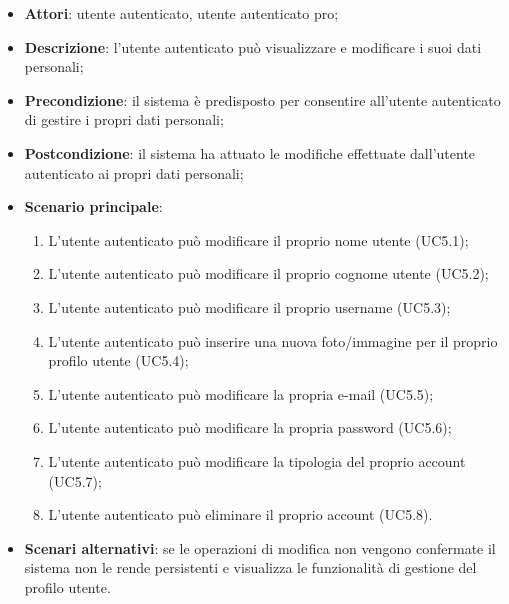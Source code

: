 \begin{itemize}
	\item \textbf{Attori}: utente autenticato, utente autenticato pro;
	\item \textbf{Descrizione}: l'utente autenticato può visualizzare e modificare i suoi dati personali;
	\item \textbf{Precondizione}: il sistema è predisposto per consentire all'utente autenticato di gestire i propri dati personali;
	\item \textbf{Postcondizione}: il sistema ha attuato le modifiche effettuate dall'utente autenticato ai propri dati personali;
	\item \textbf{Scenario principale}:
		\begin{enumerate}
			\item L'utente autenticato può modificare il proprio nome utente (UC5.1);
			\item L'utente autenticato può modificare il proprio cognome utente (UC5.2);
			\item L'utente autenticato può modificare il proprio username (UC5.3);
			\item L'utente autenticato può inserire una nuova foto/immagine per il proprio profilo utente (UC5.4);
			\item L'utente autenticato può modificare la propria e-mail (UC5.5);
			\item L'utente autenticato può modificare la propria password (UC5.6);
			\item L'utente autenticato può modificare la tipologia del proprio account (UC5.7);
			\item L'utente autenticato può eliminare il proprio account (UC5.8).
		\end{enumerate} 
	\item \textbf{Scenari alternativi}: se le operazioni di modifica non vengono confermate il sistema non le rende persistenti e visualizza le funzionalità di gestione del profilo utente. 
\end{itemize}


